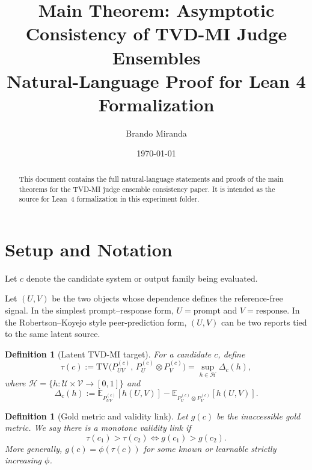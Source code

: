 \documentclass[11pt]{article}
\title{Main Theorem: Asymptotic Consistency of TVD-MI Judge Ensembles\\
\large Natural-Language Proof for Lean 4 Formalization}
\author{Brando Miranda}
\date{\today}
\newtheorem{definition}[theorem]{Definition}
\newcommand{\E}{\mathbb{E}}
\newcommand{\cH}{\mathcal{H}}
\newcommand{\cU}{\mathcal{U}}
\newcommand{\cV}{\mathcal{V}}
\begin{document}
\maketitle

\begin{abstract}
This document contains the full natural-language statements and proofs of the
main theorems for the TVD-MI judge ensemble consistency paper. It is intended
as the source for Lean~4 formalization in this experiment folder.
\end{abstract}

\tableofcontents

\section{Setup and Notation}
\label{sec:setup}

Let $c$ denote the candidate system or output family being evaluated.

Let $(U, V)$ be the two objects whose dependence defines the reference-free
signal. In the simplest prompt--response form, $U = \text{prompt}$ and
$V = \text{response}$. In the Robertson--Koyejo style peer-prediction form,
$(U, V)$ can be two reports tied to the same latent source.

\begin{definition}[Latent TVD-MI target]
\label{def:tvd-mi-target}
For a candidate $c$, define
\begin{equation}
\tau(c)
:= \mathrm{TV}\!\big(P^{(c)}_{UV},\, P^{(c)}_{U}\otimes P^{(c)}_{V}\big)
= \sup_{h \in \cH} \Delta_c(h),
\end{equation}
where $\cH = \{h : \cU \times \cV \to [0,1]\}$ and
\begin{equation}
\Delta_c(h)
:= \E_{P^{(c)}_{UV}}[h(U,V)]
- \E_{P^{(c)}_{U}\otimes P^{(c)}_{V}}[h(U,V)].
\end{equation}
\end{definition}

\begin{definition}[Gold metric and validity link]
\label{def:gold-metric}
Let $g(c)$ be the inaccessible gold metric. We say there is a
\emph{monotone validity link} if
\begin{equation}
\tau(c_1) > \tau(c_2) \iff g(c_1) > g(c_2).
\end{equation}
More generally, $g(c) = \phi(\tau(c))$ for some known or learnable
strictly increasing $\phi$.
\end{definition}
\end{document}
